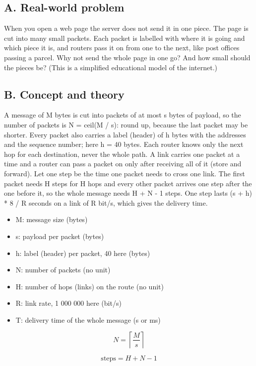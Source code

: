 \documentclass[11pt,a4paper]{article}
\begin{document}
\subsection*{A. Real-world problem}
When you open a web page the server does not send it in one piece. The page is cut into many small packets. Each packet is labelled with where it is going and which piece it is, and routers pass it on from one to the next, like post offices passing a parcel. Why not send the whole page in one go? And how small should the pieces be? (This is a simplified educational model of the internet.)

\subsection*{B. Concept and theory}
A message of M bytes is cut into packets of at most s bytes of payload, so the number of packets is N = ceil(M / s): round up, because the last packet may be shorter. Every packet also carries a label (header) of h bytes with the addresses and the sequence number; here h = 40 bytes. Each router knows only the next hop for each destination, never the whole path. A link carries one packet at a time and a router can pass a packet on only after receiving all of it (store and forward). Let one step be the time one packet needs to cross one link. The first packet needs H steps for H hops and every other packet arrives one step after the one before it, so the whole message needs H + N - 1 steps. One step lasts (s + h) * 8 / R seconds on a link of R bit/s, which gives the delivery time.

\begin{itemize}[nosep]
\item M: message size (bytes)
\item s: payload per packet (bytes)
\item h: label (header) per packet, 40 here (bytes)
\item N: number of packets (no unit)
\item H: number of hops (links) on the route (no unit)
\item R: link rate, 1 000 000 here (bit/s)
\item T: delivery time of the whole message (s or ms)
\end{itemize}

\begin{equation*}
N=\left\lceil \frac{M}{s}\right\rceil
\end{equation*}

\begin{equation*}
\text{steps}=H+N-1
\end{equation*}
\end{document}
